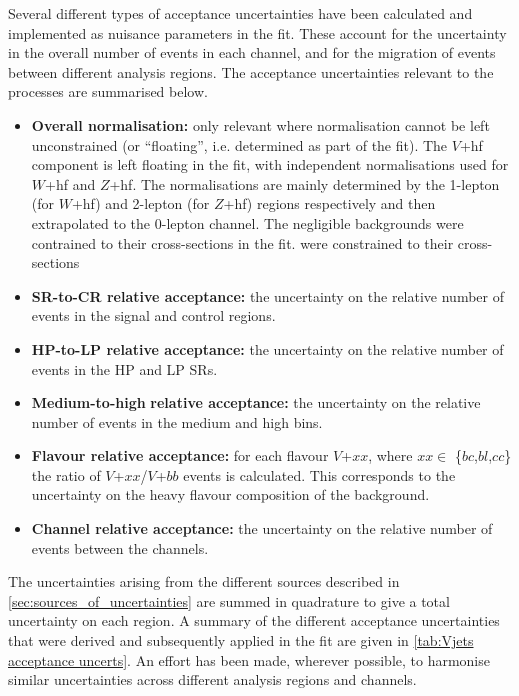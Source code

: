 Several different types of acceptance uncertainties have been calculated and implemented as nuisance parameters in the fit.
These account for the uncertainty in the overall number of events in each channel, and for the migration of events between different analysis regions.
The acceptance uncertainties relevant to the \Vjets processes are summarised below.
%
\begin{itemize}
    \item \textbf{Overall normalisation:} only relevant where normalisation cannot be left unconstrained (or ``floating'', i.e. determined as part of the fit). The $V$+hf component is left floating in the fit, with independent normalisations used for $W$+hf and $Z$+hf. The normalisations are mainly determined by the 1-lepton (for $W$+hf) and 2-lepton (for $Z$+hf) regions respectively and then extrapolated to the 0-lepton channel.
    The negligible \Vjets backgrounds were contrained to their cross-sections in the fit.
    were constrained to their cross-sections
    \item \textbf{SR-to-CR relative acceptance:} the uncertainty on the relative number of \Vjets events in the signal and control regions.
    \item \textbf{HP-to-LP relative acceptance:} the uncertainty on the relative number of \Vjets events in the HP and LP SRs.
    \item \textbf{Medium-to-high} \pTV \textbf{relative acceptance:} the uncertainty on the relative number of \Vjets events in the medium and high \ptv bins.
    \item \textbf{Flavour relative acceptance:} for each flavour $V$+$xx$, where $xx\in$ \{$bc$,$bl$,$cc$\} the ratio of $V$+$xx$/$V$+$bb$ events is calculated. 
    This corresponds to the uncertainty on the heavy flavour composition of the \Vhf background.
    \item \textbf{Channel relative acceptance:} the uncertainty on the relative number of \Vjets events between the channels.
\end{itemize}
%
The uncertainties arising from the different sources described in \cref{sec:sources_of_uncertainties} are summed in quadrature to give a total uncertainty on each region.
A summary of the different acceptance uncertainties that were derived and subsequently applied in the fit are given in \cref{tab:Vjets acceptance uncerts}.
An effort has been made, wherever possible, to harmonise similar uncertainties across different analysis regions and channels.

